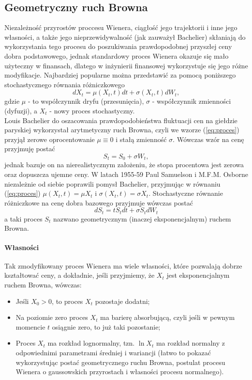 \documentclass[]{pwr_wmat_praca_dyplomowa}
\theoremstyle{plain}
\numberwithin{theorem}{chapter}
\theoremstyle{definition}
\numberwithin{theorem}{chapter}
\begin{document}
\subsection{Geometryczny ruch Browna}
Niezależność przyrostów proccesu Wienera, ciągłość jego trajektorii i inne jego własności, a także jego nieprzewidywalność (jak zauważył Bachelier) skłaniają do wykorzystania tego procesu do poszukiwania prawdopodobnej przyszłej ceny dobra podstawowego, jednak standardowy proces Wienera okazuje się mało użyteczny w finansach, dlatego w inżynierii finansowej wykorzystuje się jego różne modyfikacje. Najbardziej popularne można przedstawić za pomocą poniższego stochastycznego równania różniczkowego
\begin{equation}
\label{eq:proces}
dX_t = \mu(X_t,t)dt + \sigma(X_t,t)dW_t,
\end{equation}
gdzie $\mu$ - to współczynnik dryfu (przesunięcia), $\sigma$ - współczynnik zmienności (dyfuzji), a $X_t$ - nowy proces stochastyczny.\\

Louis Bachelier do oszacowania prawdopodobieństwa fluktuacji cen na giełdzie paryskiej wykorzystał arytmetyczny ruch Browna, czyli we wzorze (\ref{eq:proces}) przyjął zerowe oprocentowanie $\mu \equiv 0$ i stałą zmienność $\sigma$. Wówczas wzór na cenę przyjmuję postać $$ S_t = S_0 + \sigma W_t,$$ jednak bazuje on na nierealistycznym założeniu, że stopa procentowa jest zerowa oraz dopuszcza ujemne ceny. W latach 1955-59 Paul Samuelson i M.F.M. Osborne niezależnie od siebie poprawili pomysł Bachelier, przyjmując w równaniu (\ref{eq:proces}) $\mu(X_t,t)=\mu X_t$ i $\sigma(X_t,t)=\sigma X_t$. Stochastyczne równanie różniczkowe na cenę dobra bazowego przyjmuje wówczas postać
\begin{equation}
\label{eq:dSt}
dS_t = t S_t dt + \sigma S_t dW_t
\end{equation}
a taki proces $S_t$ nazwano geometrycznym (inaczej eksponencjalnym) ruchem Browna.

\paragraph{Własności} Tak zmodyfikowany proces Wienera ma wiele własności, które pozwalają dobrze kształtować ceny, a dokładnie, jeśli przyjmiemy, że $X_t$ jest eksponencjalnym ruchem Browna, wówczas:
\begin{itemize}
\item Jeśli $X_0 > 0$, to proces $X_t$ pozostaje dodatni;
\item Na poziomie zero proces $X_t$ ma barierę absorbującą, czyli jeśli w pewnym momencie $t$ osiągnie zero, to już taki pozostanie;
\item Proces $X_t$ ma rozkład lognormalny, tzn. $\ln X_t$ ma rozkład normalny z odpowiednimi parametrami średniej i wariancji (łatwo to pokazać wykorzystując postać geometrycznego ruchu Browna, postulat procesu Wienera o gaussowskich przyrostach i własności procesu normalnego).
\end{itemize}
\end{document}
